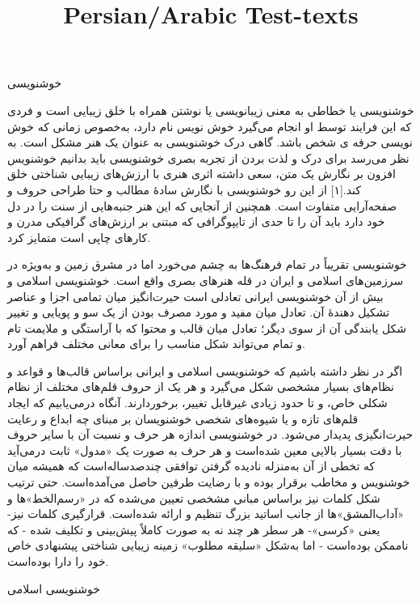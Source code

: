 \documentclass[a4paper]{article}
\title{Persian/Arabic Test-texts}
\begin{document}
\pagecolor{pagecolor}
\color{textcolor}

\maketitle
\tableofcontents
\newpage


خوشنویسی


خوشنویسی یا خطاطی به معنی زیبانویسی یا نوشتن همراه با خلق زیبایی است و فردی که این فرایند توسط او انجام می‌گیرد خوش نویس نام دارد، به‌خصوص زمانی که خوش نویسی حرفه ی شخص باشد. گاهی درک خوشنویسی به عنوان یک هنر مشکل است. به نظر می‌رسد برای درک و لذت بردن از تجربه بصری خوشنویسی باید بدانیم خوشنویس افزون بر نگارش یک متن، سعی داشته اثری هنری با ارزش‌های زیبایی شناختی خلق کند.[۱] از این رو خوشنویسی با نگارش سادهٔ مطالب و حتا طراحی حروف و صفحه‌آرایی متفاوت است. همچنین از آنجایی که این هنر جنبه‌هایی از سنت را در دل خود دارد باید آن را تا حدی از تایپوگرافی که مبتنی بر ارزش‌های گرافیکی مدرن و کارهای چاپی است متمایز کرد.

خوشنویسی تقریباً در تمام فرهنگ‌ها به چشم می‌خورد اما در مشرق زمین و به‌ویژه در سرزمین‌های اسلامی و ایران در قله هنرهای بصری واقع است. خوشنویسی اسلامی و بیش از آن خوشنویسی ایرانی تعادلی است حیرت‌انگیز میان تمامی اجزا و عناصر تشکیل دهندهٔ آن. تعادل میان مفید و مورد مصرف بودن از یک سو و پویایی و تغییر شکل یابندگی آن از سوی دیگر؛ تعادل میان قالب و محتوا که با آراستگی و ملایمت تام و تمام می‌تواند شکل مناسب را برای معانی مختلف فراهم آورد.

اگر در نظر داشته باشیم که خوشنویسی اسلامی و ایرانی براساس قالب‌ها و قواعد و نظام‌های بسیار مشخصی شکل می‌گیرد و هر یک از حروف قلم‌های مختلف از نظام شکلی خاص، و تا حدود زیادی غیرقابل تغییر، برخوردارند. آنگاه درمی‌یابیم که ایجاد قلم‌های تازه و یا شیوه‌های شخصی خوشنویسان بر مبنای چه ابداع و رعایت حیرت‌انگیزی پدیدار می‌شود. در خوشنویسی اندازه هر حرف و نسبت آن با سایر حروف با دقت بسیار بالایی معین شده‌است و هر حرف به صورت یک «مدول» ثابت درمی‌آید که تخطی از آن به‌منزله نادیده گرفتن توافقی چندصدساله‌است که همیشه میان خوشنویس و مخاطب برقرار بوده و با رضایت طرفین حاصل می‌آمده‌است. حتی ترتیب شکل کلمات نیز براساس مبانی مشخصی تعیین می‌شده که در «رسم‌الخط»ها و «آداب‌المشق»ها از جانب اساتید بزرگ تنظیم و ارائه شده‌است. قرارگیری کلمات نیز- یعنی «کرسی»- هر سطر هر چند نه به صورت کاملاً پیش‌بینی و تکلیف شده - که ناممکن بوده‌است - اما به‌شکل «سلیقه مطلوب» زمینه زیبایی شناختی پیشنهادی خاص خود را دارا بوده‌است.



خوشنویسی اسلامی
\end{document}
